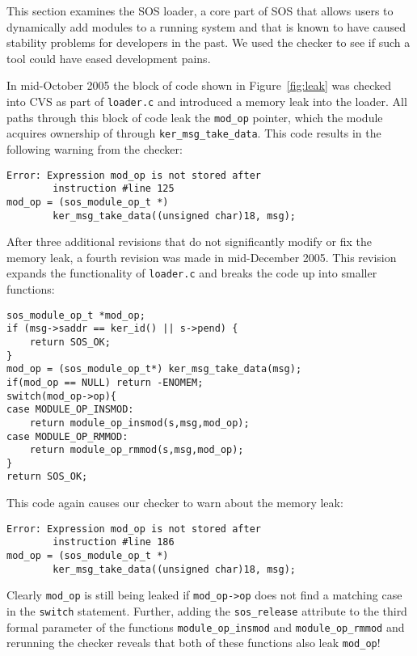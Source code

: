 This section examines the SOS loader, a core part of SOS that allows
users to dynamically add modules to a running system and that is
known to have caused stability problems for developers in the past.
We used the checker to see if such a tool could have eased development
pains.

In mid-October 2005 the block of code shown in Figure~\ref{fig:leak}
was checked into CVS as part of {\tt loader.c} and introduced a memory
leak into the loader.  All paths through this block of code leak the
{\tt mod\_op} pointer, which the module acquires ownership of through
{\tt ker\_msg\_take\_data}.  This code results in the following
warning from the checker:

\begin{scriptsize}
\begin{verbatim}
Error: Expression mod_op is not stored after 
        instruction #line 125
mod_op = (sos_module_op_t *)
        ker_msg_take_data((unsigned char)18, msg);
\end{verbatim}
\end{scriptsize}

After three additional revisions that do not significantly modify or
fix the memory leak, a fourth revision was made in mid-December 2005.
This revision expands the functionality of {\tt loader.c} and breaks
the code up into smaller functions:

\begin{scriptsize}
\begin{verbatim}
sos_module_op_t *mod_op;
if (msg->saddr == ker_id() || s->pend) {
    return SOS_OK;
}
mod_op = (sos_module_op_t*) ker_msg_take_data(msg);
if(mod_op == NULL) return -ENOMEM;
switch(mod_op->op){
case MODULE_OP_INSMOD:
    return module_op_insmod(s,msg,mod_op);
case MODULE_OP_RMMOD:
    return module_op_rmmod(s,msg,mod_op);
}
return SOS_OK;
\end{verbatim}
\end{scriptsize}

This code again causes our checker to warn about the memory leak:

\begin{scriptsize}
\begin{verbatim}
Error: Expression mod_op is not stored after 
        instruction #line 186
mod_op = (sos_module_op_t *)
        ker_msg_take_data((unsigned char)18, msg);
\end{verbatim}
\end{scriptsize}

Clearly {\tt mod\_op} is still being leaked if {\tt mod\_op->op} does
not find a matching case in the {\tt switch} statement.  Further,
adding the {\tt sos\_release} attribute to the third formal parameter
of the functions {\tt module\_op\_insmod} and {\tt module\_op\_rmmod}
and rerunning the checker reveals that both of these functions also
leak {\tt mod\_op}!

